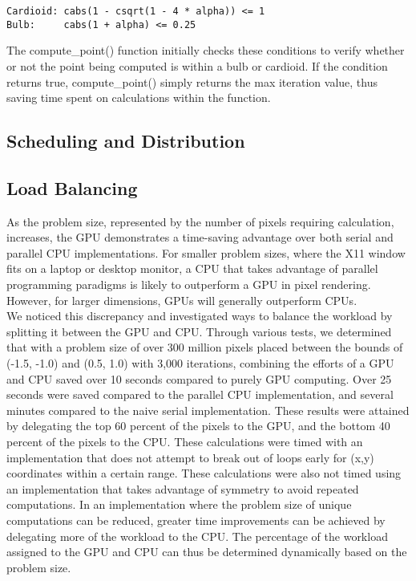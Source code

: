\documentclass{article}
\begin{document}
\begin{verbatim}
Cardioid: cabs(1 - csqrt(1 - 4 * alpha)) <= 1
Bulb:     cabs(1 + alpha) <= 0.25
\end{verbatim}

The compute\_point() function initially checks these conditions to verify whether or not the point being computed is within a bulb or cardioid. If the condition returns true, compute\_point() simply returns the max iteration value, thus saving time spent on calculations within the function.

\subsection{Scheduling and Distribution}

\subsection{Load Balancing}

As the problem size, represented by the number of pixels requiring calculation, increases, the GPU demonstrates a time-saving advantage over both serial and parallel CPU implementations. For smaller problem sizes, where the X11 window fits on a laptop or desktop monitor, a CPU that takes advantage of parallel programming paradigms is likely to outperform a GPU in pixel rendering. However, for larger dimensions, GPUs will generally outperform CPUs.\\

We noticed this discrepancy and investigated ways to balance the workload by splitting it between the GPU and CPU. Through various tests, we determined that with a problem size of over 300 million pixels placed between the bounds of (-1.5, -1.0) and (0.5, 1.0) with 3,000 iterations, combining the efforts of a GPU and CPU saved over 10 seconds compared to purely GPU computing. Over 25 seconds were saved compared to the parallel CPU implementation, and several minutes compared to the naive serial implementation. These results were attained by delegating the top 60 percent of the pixels to the GPU, and the bottom 40 percent of the pixels to the CPU. These calculations were timed with an implementation that does not attempt to break out of loops early for (x,y) coordinates within a certain range. These calculations were also not timed using an implementation that takes advantage of symmetry to avoid repeated computations. In an implementation where the problem size of unique computations can be reduced, greater time improvements can be achieved by delegating more of the workload to the CPU. The percentage of the workload assigned to the GPU and CPU can thus be determined dynamically based on the problem size. 
\end{document}
